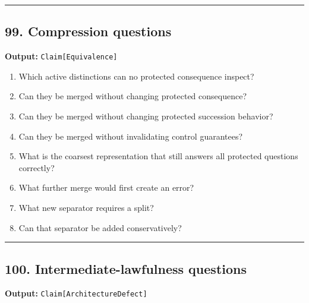 \documentclass[
]{article}
\providecommand{\tightlist}{%
  \setlength{\itemsep}{0pt}\setlength{\parskip}{0pt}}
\begin{document}
\begin{center}\rule{0.5\linewidth}{0.5pt}\end{center}

\subsection{99. Compression questions}\label{compression-questions}

\textbf{Output:} \texttt{Claim{[}Equivalence{]}}

\begin{enumerate}
\def\labelenumi{\arabic{enumi}.}
\tightlist
\item
  Which active distinctions can no protected consequence inspect?
\item
  Can they be merged without changing protected consequence?
\item
  Can they be merged without changing protected succession behavior?
\item
  Can they be merged without invalidating control guarantees?
\item
  What is the coarsest representation that still answers all protected
  questions correctly?
\item
  What further merge would first create an error?
\item
  What new separator requires a split?
\item
  Can that separator be added conservatively?
\end{enumerate}

\begin{center}\rule{0.5\linewidth}{0.5pt}\end{center}

\subsection{100. Intermediate-lawfulness
questions}\label{intermediate-lawfulness-questions}

\textbf{Output:} \texttt{Claim{[}ArchitectureDefect{]}}
\end{document}

